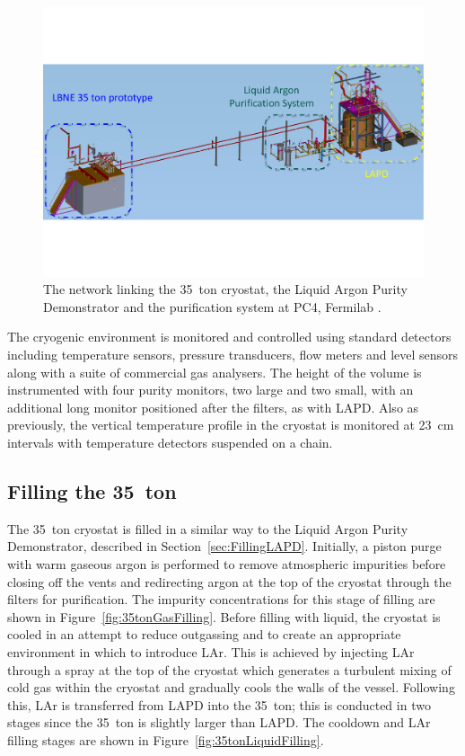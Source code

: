 \begin{figure}
  \centering
  \includegraphics[width=14cm]{35tonLAPD.pdf}
  \caption[The network linking the 35~ton cryostat, the Liquid Argon Purity Demonstrator and the purification system at PC4, Fermilab.]{The network linking the 35~ton cryostat, the Liquid Argon Purity Demonstrator and the purification system at PC4, Fermilab \cite{35tonPhaseI2014}.}
  \label{fig:35tonLAPD}
\end{figure}

The cryogenic environment is monitored and controlled using standard detectors including temperature sensors, pressure transducers, flow meters and level sensors along with a suite of commercial gas analysers.  The height of the volume is instrumented with four purity monitors, two large and two small, with an additional long monitor positioned after the filters, as with LAPD.  Also as previously, the vertical temperature profile in the cryostat is monitored at 23~cm intervals with temperature detectors suspended on a chain.

\subsection{Filling the 35~ton}\label{sec:35tonFilling}

The 35~ton cryostat is filled in a similar way to the Liquid Argon Purity Demonstrator, described in Section~\ref{sec:FillingLAPD}.  Initially, a piston purge with warm gaseous argon is performed to remove atmospheric impurities before closing off the vents and redirecting argon at the top of the cryostat through the filters for purification.  The impurity concentrations for this stage of filling are shown in Figure~\ref{fig:35tonGasFilling}.  Before filling with liquid, the cryostat is cooled in an attempt to reduce outgassing and to create an appropriate environment in which to introduce LAr.  This is achieved by injecting LAr through a spray at the top of the cryostat which generates a turbulent mixing of cold gas within the cryostat and gradually cools the walls of the vessel.  Following this, LAr is transferred from LAPD into the 35~ton; this is conducted in two stages since the 35~ton is slightly larger than LAPD.  The cooldown and LAr filling stages are shown in Figure~\ref{fig:35tonLiquidFilling}.

